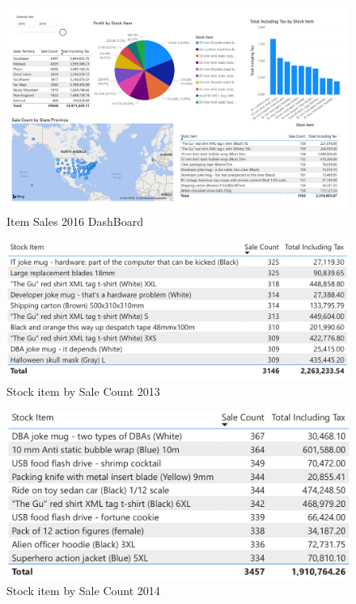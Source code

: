 \documentclass[12pt]{article}
\begin{document}
\begin{figure}[H]
    \centering
    \includegraphics[width=18.5cm, angle=90]
    {images/Item sales2016.pdf}
    \caption{Item Sales 2016 DashBoard}
    \label{Item Sales 2016 DashBoard}
\end{figure}

\begin{figure}[H]
    \centering
    \includegraphics [width=17.5cm]
    {images/Sales/stock item by Sale Count2013.png}
    \caption{Stock item by Sale Count 2013}
    \label{Stock item by Sale Count 2013}
\end{figure}

\begin{figure}[H]
    \centering
    \includegraphics [width=17.5cm]
    {images/Sales/stock item by Sale Count2014.png}
    \caption{Stock item by Sale Count 2014}
    \label{Stock item by Sale Count 2014}
\end{figure}
\end{document}
